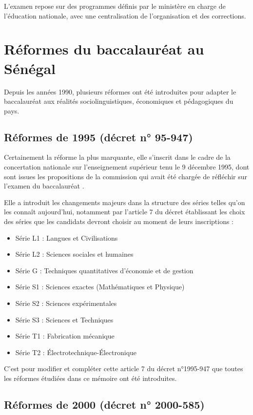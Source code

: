 L’examen repose sur des programmes définis par le ministère en charge de l’éducation nationale, avec une centralisation de l’organisation et des corrections.

\section{Réformes du baccalauréat au Sénégal}

Depuis les années 1990, plusieurs réformes ont été introduites pour adapter le baccalauréat aux réalités sociolinguistiques, 
économiques et pédagogiques du pays.

\subsection{Réformes de 1995 (décret n° 95-947)}

Certainement la réforme la plus marquante, elle s'inscrit dans le cadre de la concertation nationale sur l'enseignement supérieur tenu le 9 décembre 1995, 
dont sont issues les propositions de la commission qui avait été chargée de réfléchir sur l'examen du baccalauréat \cite{decret95}.

Elle a introduit les changements majeurs dans la structure des séries telles qu'on les connaît aujourd'hui, 
notamment par l'article 7 du décret établissant les choix des séries que les candidats devront choisir au moment de leurs inscriptions :

\begin{itemize}
    \item Série L1 : Langues et Civilisations
    \item Série L2 : Sciences sociales et humaines
    \item Série G : Techniques quantitatives d'économie et de gestion
    \item Série S1 : Sciences exactes (Mathématiques et Physique)
    \item Série S2 : Sciences expérimentales
    \item Série S3 : Sciences et Techniques
    \item Série T1 : Fabrication mécanique
    \item Série T2 : Électrotechnique-Électronique
\end{itemize}

C'est pour modifier et compléter cette article 7 du décret n°1995-947 que toutes les réformes étudiées dans ce mémoire ont été introduites.

\subsection{Réformes de 2000 (décret n° 2000-585)}

